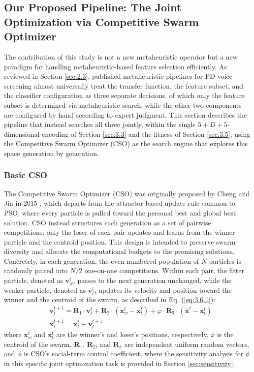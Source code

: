 \subsection{Our Proposed Pipeline: The Joint Optimization via Competitive Swarm Optimizer} \label{sec:3.6}
The contribution of this study is not a new metaheuristic operator but a new paradigm for handling metaheuristic-based feature selection efficiently. As reviewed in Section \ref{sec:2.3}, published metaheuristic pipelines for PD voice screening almost universally treat the transfer function, the feature subset, and the classifier configuration as three separate decisions, of which only the feature subset is determined via metaheuristic search, while the other two components are configured by hand according to expert judgment. This section describes the pipeline that instead searches all three jointly, within the single $5+D+5$-dimensional encoding of Section \ref{sec:3.3} and the fitness of Section \ref{sec:3.5}, using the Competitive Swarm Optimizer (CSO) \cite{Cheng:2015} as the search engine that explores this space generation by generation.

\subsubsection{Basic CSO} \label{sec:3.6.1}
The Competitive Swarm Optimizer (CSO) was originally proposed by Cheng and Jin in 2015 \cite{Cheng:2015}, which departs from the attractor-based update rule common to PSO, where every particle is pulled toward the personal best and global best solution. CSO instead structures each generation as a set of pairwise competitions: only the loser of each pair updates and learns from the winner particle and the centroid position. This design is intended to preserve swarm diversity and allocate the computational budgets to the promising solutions. Concretely, in each generation, the even-numbered population of $N$ particles is randomly paired into $N/2$ one-on-one competitions. Within each pair, the fitter particle, denoted as $\bm{v}^t_w$, passes to the next generation unchanged, while the weaker particle, denoted as $\bm{v}^t_l$, updates its velocity and position toward the winner and the centroid of the swarm, as described in Eq. (\ref{eq:3.6.1}):
\begin{equation}
    \label{eq:3.6.1}
    \begin{aligned}
        & \bm{v}^{t+1}_l = \bm{R}_1 \cdot \bm{v}^t_l + \bm{R}_2 \cdot (\bm{x}^t_w - \bm{x}^t_l) + \varphi \cdot \bm{R}_3 \cdot (\bar{\bm{x}}^t - \bm{x}^t_l) \\
        & \bm{x}^{t+1}_l = \bm{x}^t_l + \bm{v}^{t+1}_l
    \end{aligned}
\end{equation}
where $\bm{x}^t_w$ and $\bm{x}^t_l$ are the winner's and loser's positions, respectively, $\bar{x}$ is the centroid of the swarm, $\bm{R}_1$, $\bm{R}_2$, and $\bm{R}_3$ are independent uniform random vectors, and $\phi$ is CSO's social-term control coefficient, where the sensitivity analysis for $\phi$ in this specific joint optimization task is provided in Section \ref{sec:sensitivity}.


